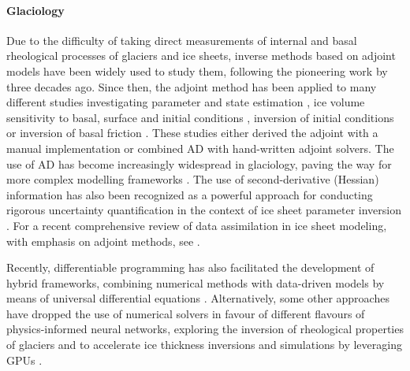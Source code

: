 \paragraph{Glaciology}

Due to the difficulty of taking direct measurements of internal and basal rheological processes of glaciers and ice sheets, inverse methods based on adjoint models have been widely used to study them, following the pioneering work by \cite{macayeal1992basal} three decades ago. 
Since then, the adjoint method has been applied to many different studies investigating parameter and state estimation \cite{Vieli.2006, goldberg2013parameter}, ice volume sensitivity to basal, surface and initial conditions \cite{heimbach2009greenland}, inversion of initial conditions \cite{mosbeux2016comparison} or inversion of basal friction \cite{Petra.2012, morlighem2013inversion}.
These studies either derived the adjoint with a manual implementation or combined AD with hand-written adjoint solvers. 
The use of AD has become increasingly widespread in glaciology, paving the way for more complex modelling frameworks \cite{hascoet2018source, Gaikwad.2023}. 
The use of second-derivative (Hessian) information has also been recognized as a powerful approach for conducting rigorous uncertainty quantification in the context of ice sheet parameter inversion \cite{Petra.2014,Isaac.2015hf}.
For a recent comprehensive review of data assimilation in ice sheet modeling, with emphasis on adjoint methods, see \cite{Morlighem.2023}.

Recently, differentiable programming has also facilitated the development of hybrid frameworks, combining numerical methods with data-driven models by means of universal differential equations \cite{BolibarSapienza_UDEs}. 
Alternatively, some other approaches have dropped the use of numerical solvers in favour of different flavours of physics-informed neural networks, exploring the inversion of rheological properties of glaciers \cite{wang2022discovering} and to accelerate ice thickness inversions and simulations by leveraging GPUs \cite{Jouvet_Cordonnier_Kim_Lüthi_Vieli_Aschwanden_2021, jouvet2023inversion}. 



